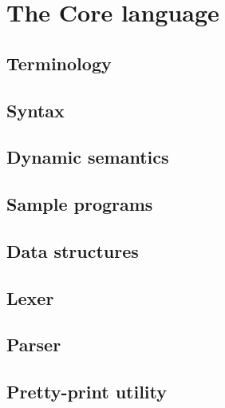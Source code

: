 \section{The Core language}
\label{sec:core}

\subsection{Terminology}
\label{sec:terminology}


\subsection{Syntax}
\label{sec:syntax}

\subsection{Dynamic semantics}
\label{sec:dynamic-semantics}

\subsection{Sample programs}
\label{sec:sample-programs}

\subsection{Data structures}
\label{sec:core-data-structures}

\subsection{Lexer}
\label{sec:lexer}

\subsection{Parser}
\label{sec:parser}

\subsection{Pretty-print utility}
\label{sec:pretty-print}
